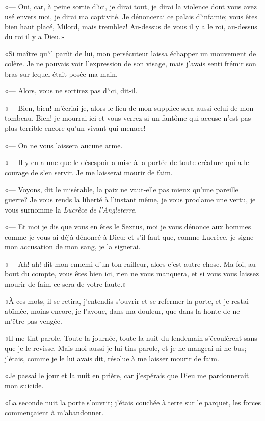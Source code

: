 «--- Oui, car, à peine sortie d'ici, je dirai tout, je dirai la violence dont vous avez usé envers moi, je dirai ma captivité. Je dénoncerai ce palais d'infamie; vous êtes bien haut placé, Milord, mais tremblez! Au-dessus de vous il y a le roi, au-dessus du roi il y a Dieu.» 

«Si maître qu'il parût de lui, mon persécuteur laissa échapper un mouvement de colère. Je ne pouvais voir l'expression de son visage, mais j'avais senti frémir son bras sur lequel était posée ma main. 

«--- Alors, vous ne sortirez pas d'ici, dit-il. 

«--- Bien, bien! m'écriai-je, alors le lieu de mon supplice sera aussi celui de mon tombeau. Bien! je mourrai ici et vous verrez si un fantôme qui accuse n'est pas plus terrible encore qu'un vivant qui menace! 

«--- On ne vous laissera aucune arme. 

«--- Il y en a une que le désespoir a mise à la portée de toute créature qui a le courage de s'en servir. Je me laisserai mourir de faim. 

«--- Voyons, dit le misérable, la paix ne vaut-elle pas mieux qu'une pareille guerre? Je vous rends la liberté à l'instant même, je vous proclame une vertu, je vous surnomme la \textit{Lucrèce de l'Angleterre}. 

«--- Et moi je dis que vous en êtes le Sextus, moi je vous dénonce aux hommes comme je vous ai déjà dénoncé à Dieu; et s'il faut que, comme Lucrèce, je signe mon accusation de mon sang, je la signerai. 

«--- Ah! ah! dit mon ennemi d'un ton railleur, alors c'est autre chose. Ma foi, au bout du compte, vous êtes bien ici, rien ne vous manquera, et si vous vous laissez mourir de faim ce sera de votre faute.» 

«À ces mots, il se retira, j'entendis s'ouvrir et se refermer la porte, et je restai abîmée, moins encore, je l'avoue, dans ma douleur, que dans la honte de ne m'être pas vengée. 

«Il me tint parole. Toute la journée, toute la nuit du lendemain s'écoulèrent sans que je le revisse. Mais moi aussi je lui tins parole, et je ne mangeai ni ne bus; j'étais, comme je le lui avais dit, résolue à me laisser mourir de faim. 

«Je passai le jour et la nuit en prière, car j'espérais que Dieu me pardonnerait mon suicide. 

«La seconde nuit la porte s'ouvrit; j'étais couchée à terre sur le parquet, les forces commençaient à m'abandonner. 

